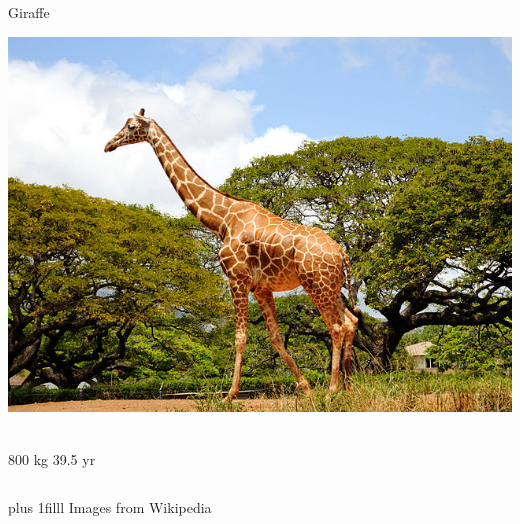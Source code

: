 \documentclass{beamer}
\newcommand{\btVFill}{\vskip0pt plus 1filll}
\begin{document}
\begin{frame}
\begin{columns}[c]
     \begin{block}{Giraffe}
      \begin{center}
        \includegraphics[height=.25\textheight]{640px-Giraffe!_(4565230826).jpg}\
      \end{center}
      800 kg \hfill 39.5 yr
    \end{block}
  \end{columns}

  \btVFill
  \small Images from Wikipedia \normalsize
\end{frame}
\end{document}
